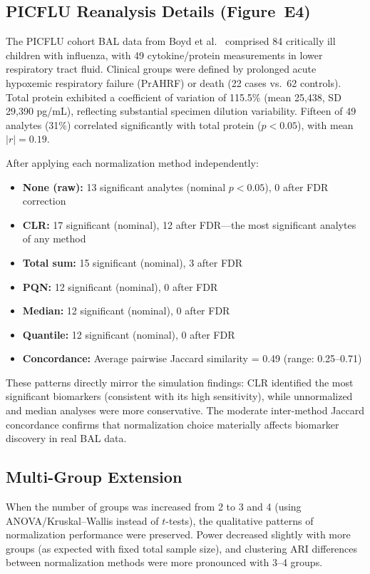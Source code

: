 \documentclass[12pt]{article}
\begin{document}
\subsection{PICFLU Reanalysis Details (Figure~E4)}

The PICFLU cohort BAL data from Boyd et al.~\cite{Boyd2020} comprised 84 critically ill children with influenza, with 49 cytokine/protein measurements in lower respiratory tract fluid. Clinical groups were defined by prolonged acute hypoxemic respiratory failure (PrAHRF) or death (22 cases vs.\ 62 controls). Total protein exhibited a coefficient of variation of 115.5\% (mean 25,438, SD 29,390 pg/mL), reflecting substantial specimen dilution variability. Fifteen of 49 analytes (31\%) correlated significantly with total protein ($p < 0.05$), with mean $|r| = 0.19$.

After applying each normalization method independently:

\begin{itemize}
\item \textbf{None (raw):} 13 significant analytes (nominal $p < 0.05$), 0 after FDR correction
\item \textbf{CLR:} 17 significant (nominal), 12 after FDR---the most significant analytes of any method
\item \textbf{Total sum:} 15 significant (nominal), 3 after FDR
\item \textbf{PQN:} 12 significant (nominal), 0 after FDR
\item \textbf{Median:} 12 significant (nominal), 0 after FDR
\item \textbf{Quantile:} 12 significant (nominal), 0 after FDR
\item \textbf{Concordance:} Average pairwise Jaccard similarity = 0.49 (range: 0.25--0.71)
\end{itemize}

These patterns directly mirror the simulation findings: CLR identified the most significant biomarkers (consistent with its high sensitivity), while unnormalized and median analyses were more conservative. The moderate inter-method Jaccard concordance confirms that normalization choice materially affects biomarker discovery in real BAL data.

\subsection{Multi-Group Extension}

When the number of groups was increased from 2 to 3 and 4 (using ANOVA/Kruskal--Wallis instead of $t$-tests), the qualitative patterns of normalization performance were preserved. Power decreased slightly with more groups (as expected with fixed total sample size), and clustering ARI differences between normalization methods were more pronounced with 3--4 groups.
\end{document}

